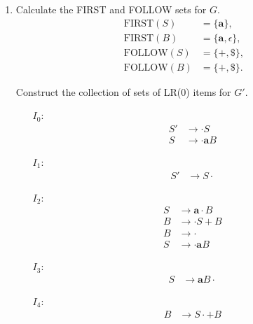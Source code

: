 \documentclass{CompilerAssignment}
\newcommand{\mbfa}{\mathbf{a}}
\newcommand{\first}{\text{FIRST}}
\newcommand{\follow}{\text{FOLLOW}}
\begin{document}
\begin{enumerate}
    \item Calculate the FIRST and FOLLOW sets for \(G\).
    \begin{align*}
        \first(S) &= \{ \mbfa \}, \\
        \first(B) &= \{ \mbfa, \epsilon \}, \\
        \follow(S) &= \{ +, \$ \}, \\
        \follow(B) &= \{ +, \$ \}.
    \end{align*}

    Construct the collection of sets of LR(0) items for \(G'\).
    \begin{multicols}{3}
        \begin{enumerate}
            \item[$I_0$:]
            \[
                \begin{aligned}
                    S' & \rightarrow \cdot S \\
                    S & \rightarrow \cdot \mbfa B
                \end{aligned}
            \]
    
            \item[$I_1$:]
            \[
                \begin{aligned}
                    S' & \rightarrow S \cdot
                \end{aligned}
            \]
    
            \item[$I_2$:]
            \[
                \begin{aligned}
                    S & \rightarrow \mbfa \cdot B \\
                    B & \rightarrow \cdot S + B \\
                    B & \rightarrow \cdot \\
                    S & \rightarrow \cdot \mbfa B
                \end{aligned}
            \]

            \item[$I_3$:]
            \[
                \begin{aligned}
                    S & \rightarrow \mbfa B \cdot
                \end{aligned}
            \]
    
            \item[$I_4$:]
            \[
                \begin{aligned}
                    B & \rightarrow S \cdot + B
                \end{aligned}
            \]
    

\end{enumerate}
\end{multicols}
\end{enumerate}
\end{document}
